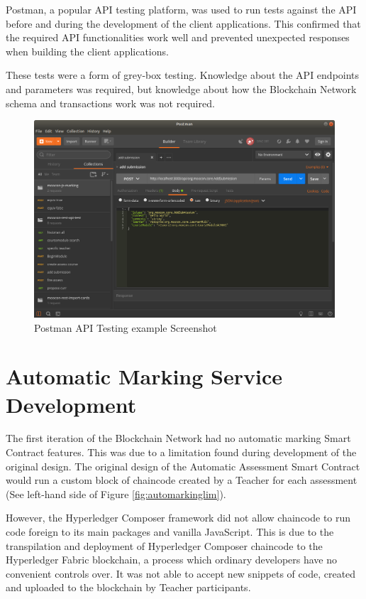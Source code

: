 Postman, a popular API testing platform, was used to run tests against the API 
before and during the development of the client applications. 
This confirmed that the required API functionalities work well and 
prevented unexpected responses when building the client applications.

These tests were a form of grey-box testing. Knowledge about the API endpoints 
and parameters was required, but knowledge about how the Blockchain Network schema
and transactions work was not required. 

\clearpage
\begin{figure}[!ht]
	\centering
	\includegraphics[width=1.0\textwidth]{postman}
	\caption[Postman API Testing example Screenshot]
	{Postman API Testing example Screenshot}
	\label{fig:postman}
\end{figure}

\section{Automatic Marking Service Development}

The first iteration of the Blockchain Network had no automatic marking Smart Contract features.
This was due to a limitation found during development of the original design. The original design
of the Automatic Assessment Smart Contract would run a custom block of chaincode
created by a Teacher for each assessment (See left-hand side of Figure \ref{fig:automarkinglim}).

However, the Hyperledger Composer framework did not allow chaincode to run code foreign to its main packages and vanilla JavaScript.
This is due to the transpilation and deployment of Hyperledger Composer chaincode to the Hyperledger Fabric blockchain,
a process which ordinary developers have no convenient controls over. It was not able to accept new snippets of code,
created and uploaded to the blockchain by Teacher participants.

